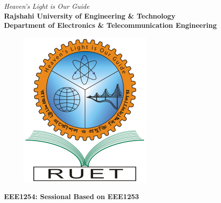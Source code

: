 \begin{titlepage}
  \begin{center}
    \textit{Heaven's Light is Our Guide}
    \\[0.5cm]
    \textbf{\Large Rajshahi University of Engineering \& Technology}
    \\[0.3cm]
    \textbf{\large Department of Electronics \& Telecommunication Engineering}
    \\[0.2cm]
    \begin{figure}[!htbp]
      \centering
      \includegraphics[scale=0.3]{Figures/logo_ruet}
      \label{fig:RUET logo}
    \end{figure}
    \textbf{\Large EEE1254: Sessional Based on EEE1253 }
    \\[0.5cm]
    \myrule[1pt][5pt]



\end{center}
\end{titlepage}
